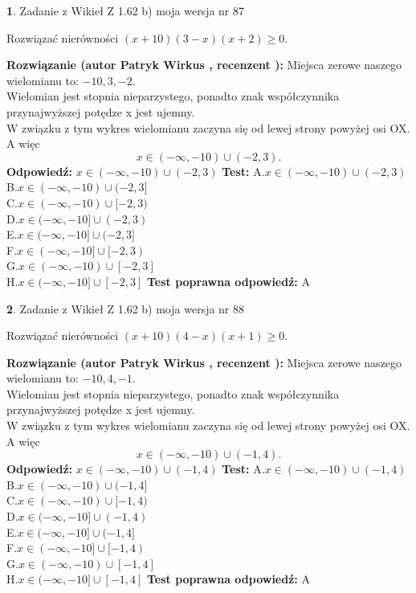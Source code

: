 \documentclass[12pt, a4paper]{article}
\theoremstyle{definition} %
\newtheorem{zad}{}
\newcommand{\zadStart}[1]{\begin{zad}#1\newline}
\newcommand{\zadStop}{\end{zad}}
\newcommand{\rozwStart}[2]{\noindent \textbf{Rozwiązanie (autor #1 , recenzent #2): }\newline}
\newcommand{\rozwStop}{\newline}
\newcommand{\odpStart}{\noindent \textbf{Odpowiedź:}\newline}
\newcommand{\odpStop}{\newline}
\newcommand{\testStart}{\noindent \textbf{Test:}\newline}
\newcommand{\testStop}{\newline}
\newcommand{\kluczStart}{\noindent \textbf{Test poprawna odpowiedź:}\newline}
\newcommand{\kluczStop}{\newline}
\begin{document}
\zadStart{Zadanie z Wikieł Z 1.62 b) moja wersja nr 87}

Rozwiązać nierówności $(x+10)(3-x)(x+2)\ge0$.
\zadStop
\rozwStart{Patryk Wirkus}{}
Miejsca zerowe naszego wielomianu to: $-10, 3, -2$.\\
Wielomian jest stopnia nieparzystego, ponadto znak współczynnika przy\linebreak najwyższej potędze x jest ujemny.\\ W związku z tym wykres wielomianu zaczyna się od lewej strony powyżej osi OX. A więc $$x \in (-\infty,-10) \cup (-2,3).$$
\rozwStop
\odpStart
$x \in (-\infty,-10) \cup (-2,3)$
\odpStop
\testStart
A.$x \in (-\infty,-10) \cup (-2,3)$\\
B.$x \in (-\infty,-10) \cup (-2,3]$\\
C.$x \in (-\infty,-10) \cup [-2,3)$\\
D.$x \in (-\infty,-10] \cup (-2,3)$\\
E.$x \in (-\infty,-10] \cup (-2,3]$\\
F.$x \in (-\infty,-10] \cup [-2,3)$\\
G.$x \in (-\infty,-10) \cup [-2,3]$\\
H.$x \in (-\infty,-10] \cup [-2,3]$
\testStop
\kluczStart
A
\kluczStop



\zadStart{Zadanie z Wikieł Z 1.62 b) moja wersja nr 88}

Rozwiązać nierówności $(x+10)(4-x)(x+1)\ge0$.
\zadStop
\rozwStart{Patryk Wirkus}{}
Miejsca zerowe naszego wielomianu to: $-10, 4, -1$.\\
Wielomian jest stopnia nieparzystego, ponadto znak współczynnika przy\linebreak najwyższej potędze x jest ujemny.\\ W związku z tym wykres wielomianu zaczyna się od lewej strony powyżej osi OX. A więc $$x \in (-\infty,-10) \cup (-1,4).$$
\rozwStop
\odpStart
$x \in (-\infty,-10) \cup (-1,4)$
\odpStop
\testStart
A.$x \in (-\infty,-10) \cup (-1,4)$\\
B.$x \in (-\infty,-10) \cup (-1,4]$\\
C.$x \in (-\infty,-10) \cup [-1,4)$\\
D.$x \in (-\infty,-10] \cup (-1,4)$\\
E.$x \in (-\infty,-10] \cup (-1,4]$\\
F.$x \in (-\infty,-10] \cup [-1,4)$\\
G.$x \in (-\infty,-10) \cup [-1,4]$\\
H.$x \in (-\infty,-10] \cup [-1,4]$
\testStop
\kluczStart
A
\kluczStop
\end{document}
